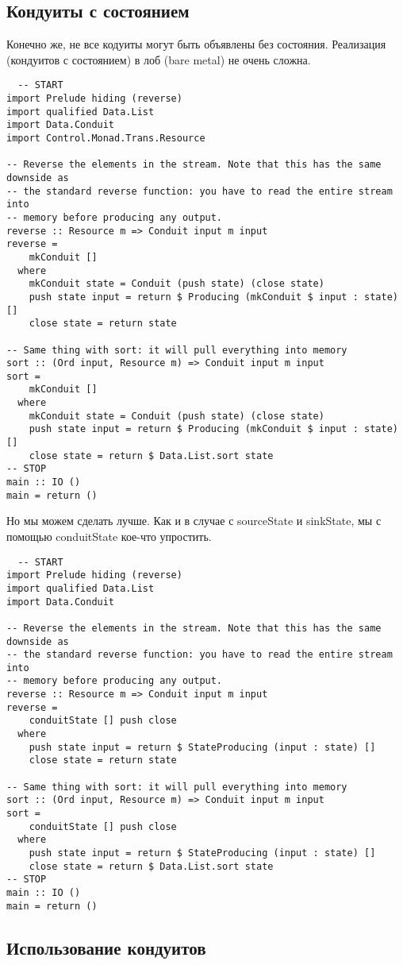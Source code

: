 \subsection{Кондуиты с состоянием}
%
Конечно же, не все кодуиты могут быть объявлены без состояния.  Реализация (кондуитов с состоянием) в лоб (bare metal) не очень сложна.
\begin{lstlisting}
  -- START
import Prelude hiding (reverse)
import qualified Data.List
import Data.Conduit
import Control.Monad.Trans.Resource

-- Reverse the elements in the stream. Note that this has the same downside as
-- the standard reverse function: you have to read the entire stream into
-- memory before producing any output.
reverse :: Resource m => Conduit input m input
reverse =
    mkConduit []
  where
    mkConduit state = Conduit (push state) (close state)
    push state input = return $ Producing (mkConduit $ input : state) []
    close state = return state

-- Same thing with sort: it will pull everything into memory
sort :: (Ord input, Resource m) => Conduit input m input
sort =
    mkConduit []
  where
    mkConduit state = Conduit (push state) (close state)
    push state input = return $ Producing (mkConduit $ input : state) []
    close state = return $ Data.List.sort state
-- STOP
main :: IO ()
main = return ()
\end{lstlisting} 
Но мы можем сделать лучше. Как и в случае с sourceState и sinkState, мы с помощью conduitState кое-что упростить.
\begin{lstlisting}
  -- START
import Prelude hiding (reverse)
import qualified Data.List
import Data.Conduit

-- Reverse the elements in the stream. Note that this has the same downside as
-- the standard reverse function: you have to read the entire stream into
-- memory before producing any output.
reverse :: Resource m => Conduit input m input
reverse =
    conduitState [] push close
  where
    push state input = return $ StateProducing (input : state) []
    close state = return state

-- Same thing with sort: it will pull everything into memory
sort :: (Ord input, Resource m) => Conduit input m input
sort =
    conduitState [] push close
  where
    push state input = return $ StateProducing (input : state) []
    close state = return $ Data.List.sort state
-- STOP
main :: IO ()
main = return ()
\end{lstlisting}
\subsection{Использование кондуитов}

